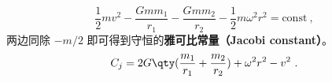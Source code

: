 
\begin{issues}
\issueDraft
\end{issues}

\begin{equation}\label{eq_JacCon_1}
\frac{1}{2}mv^2 - \frac{Gmm_1}{r_1} - \frac{Gmm_2}{r_2} - \frac{1}{2}m\omega^2 r^2 = \text{const}~,
\end{equation}
两边同除 $-m/2$ 即可得到守恒的\textbf{雅可比常量（Jacobi constant）}。
\begin{equation}
C_j = 2G\qty(\frac{m_1}{r_1} + \frac{m_2}{r_2}) + \omega^2 r^2 - v^2~.
\end{equation}
